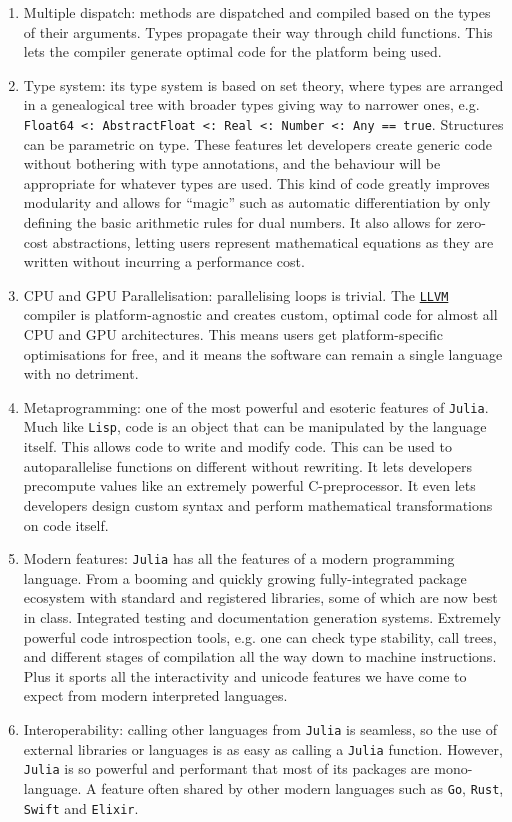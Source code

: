 \begin{enumerate}
    \item Multiple dispatch: methods are dispatched and compiled based on the types of their arguments. Types propagate their way through child functions. This lets the compiler generate optimal code for the platform being used.
    \item Type system: its type system is based on set theory, where types are arranged in a genealogical tree with broader types giving way to narrower ones, e.g. \texttt{Float64 <: AbstractFloat <: Real <: Number <: Any == true}. Structures can be parametric on type. These features let developers create generic code without bothering with type annotations, and the behaviour will be appropriate for whatever types are used. This kind of code greatly improves modularity and allows for ``magic'' such as automatic differentiation by only defining the basic arithmetic rules for dual numbers. It also allows for zero-cost abstractions, letting users represent mathematical equations as they are written without incurring a performance cost.
    \item CPU and GPU Parallelisation: parallelising loops is trivial. The \href{https://llvm.org/}{\texttt{LLVM}} compiler is platform-agnostic and creates custom, optimal code for almost all CPU and GPU architectures. This means users get platform-specific optimisations for free, and it means the software can remain a single language with no detriment.
    \item Metaprogramming: one of the most powerful and esoteric features of \texttt{Julia}. Much like \texttt{Lisp}, code is an object that can be manipulated by the language itself. This allows code to write and modify code. This can be used to autoparallelise functions on different without rewriting. It lets developers precompute values like an extremely powerful C-preprocessor. It even lets developers design custom syntax and perform mathematical transformations on code itself.
    \item Modern features: \texttt{Julia} has all the features of a modern programming language. From a booming and quickly growing fully-integrated package ecosystem with standard and registered libraries, some of which are now best in class. Integrated testing and documentation generation systems. Extremely powerful code introspection tools, e.g. one can check type stability, call trees, and different stages of compilation all the way down to machine instructions. Plus it sports all the interactivity and unicode features we have come to expect from modern interpreted languages.
    \item Interoperability: calling other languages from \texttt{Julia} is seamless, so the use of external libraries or languages is as easy as calling a \texttt{Julia} function. However, \texttt{Julia} is so powerful and performant that most of its packages are mono-language. A feature often shared by other modern languages such as \texttt{Go}, \texttt{Rust}, \texttt{Swift} and \texttt{Elixir}.
\end{enumerate}

